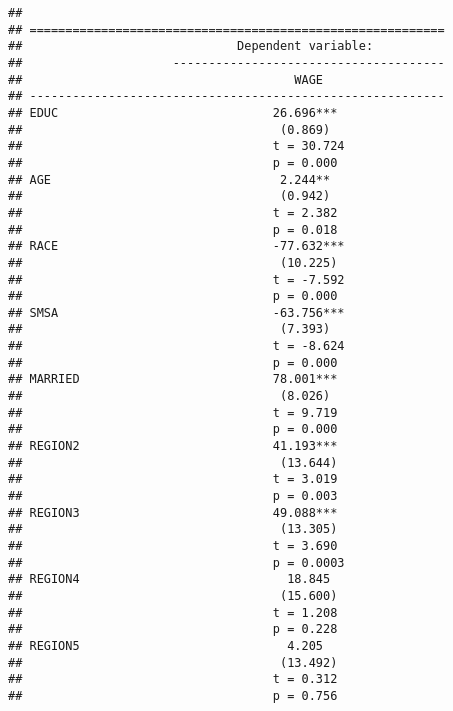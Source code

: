 \documentclass[
]{article}
\begin{document}
\begin{verbatim}
## 
## ==========================================================
##                              Dependent variable:          
##                     --------------------------------------
##                                      WAGE                 
## ----------------------------------------------------------
## EDUC                              26.696***               
##                                    (0.869)                
##                                   t = 30.724              
##                                   p = 0.000               
## AGE                                2.244**                
##                                    (0.942)                
##                                   t = 2.382               
##                                   p = 0.018               
## RACE                              -77.632***              
##                                    (10.225)               
##                                   t = -7.592              
##                                   p = 0.000               
## SMSA                              -63.756***              
##                                    (7.393)                
##                                   t = -8.624              
##                                   p = 0.000               
## MARRIED                           78.001***               
##                                    (8.026)                
##                                   t = 9.719               
##                                   p = 0.000               
## REGION2                           41.193***               
##                                    (13.644)               
##                                   t = 3.019               
##                                   p = 0.003               
## REGION3                           49.088***               
##                                    (13.305)               
##                                   t = 3.690               
##                                   p = 0.0003              
## REGION4                             18.845                
##                                    (15.600)               
##                                   t = 1.208               
##                                   p = 0.228               
## REGION5                             4.205                 
##                                    (13.492)               
##                                   t = 0.312               
##                                   p = 0.756               

\end{verbatim}
\end{document}
